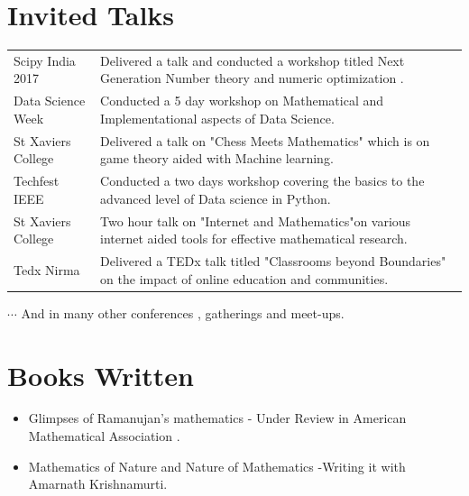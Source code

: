 \documentclass[]{deedy-resume-openfont}
\begin{document}
\section{Invited Talks}
\hline
\vspace{\topsep}
\begin{tabular}{ll}
Scipy India 2017 & Delivered a talk and conducted a workshop titled Next Generation Number theory and numeric optimization .\\
Data Science Week & Conducted a 5 day workshop on Mathematical and Implementational aspects of Data Science. \\
St Xaviers College & Delivered a talk on "Chess Meets Mathematics" which is on game theory aided with Machine learning.\\
Techfest IEEE & Conducted a two days workshop covering the basics to the advanced level of Data science in Python.\\
St Xaviers College & Two hour talk on  "Internet and Mathematics"on various internet aided tools for effective mathematical research.\\
Tedx Nirma & Delivered a TEDx talk titled "Classrooms beyond Boundaries" on the impact of online education and communities.\\
\end{tabular}
$\cdots$ And in many other conferences , gatherings and meet-ups.
\sectionsep




\section{Books Written}
\hline
\vspace{\topsep}
\begin{itemize}
\item Glimpses of Ramanujan’s mathematics - Under Review in American Mathematical Association .
\item Mathematics of Nature and Nature of Mathematics -Writing it with Amarnath Krishnamurti.
\end{itemize}
\sectionsep
\end{document}
